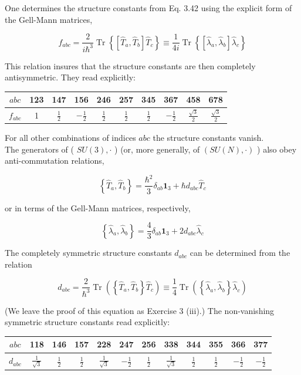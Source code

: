 \documentclass[10pt, letterpaper]{article}
\begin{document}
One determines the structure constants from Eq. 3.42 using the explicit form of the Gell-Mann matrices,

$$
f_{a b c}=\frac{2}{i \hbar^{3}} \operatorname{Tr}\left\{\left[\hat{T}_{a}, \hat{T}_{b}\right] \hat{T}_{c}\right\} \equiv \frac{1}{4 i} \operatorname{Tr}\left\{\left[\hat{\lambda}_{a}, \hat{\lambda}_{b}\right] \hat{\lambda}_{c}\right\}
$$

This relation insures that the structure constants are then completely antisymmetric. They read explicitly:

\begin{center}
\begin{tabular}{c||c|c|c|c|c|c|c|c|c}
$a b c$ & 123 & 147 & 156 & 246 & 257 & 345 & 367 & 458 & 678 \\
\hline
$f_{a b c}$ & 1 & $\frac{1}{2}$ & $-\frac{1}{2}$ & $\frac{1}{2}$ & $\frac{1}{2}$ & $\frac{1}{2}$ & $-\frac{1}{2}$ & $\frac{\sqrt{3}}{2}$ & $\frac{\sqrt{3}}{2}$ \\
\hline
\end{tabular}
\end{center}

For all other combinations of indices $a b c$ the structure constants vanish.\\
The generators of ( $S U(3), \cdot$ ) (or, more generally, of $(S U(N), \cdot)$ ) also obey anti-commutation relations,

$$
\left\{\hat{T}_{a}, \hat{T}_{b}\right\}=\frac{\hbar^{2}}{3} \delta_{a b} \mathbf{1}_{3}+\hbar d_{a b c} \hat{T}_{c}
$$

or in terms of the Gell-Mann matrices, respectively,

$$
\left\{\hat{\lambda}_{a}, \hat{\lambda}_{b}\right\}=\frac{4}{3} \delta_{a b} \mathbf{1}_{3}+2 d_{a b c} \hat{\lambda}_{c}
$$

The completely symmetric structure constants $d_{a b c}$ can be determined from the relation

$$
d_{a b c}=\frac{2}{\hbar^{3}} \operatorname{Tr}\left(\left\{\hat{T}_{a}, \hat{T}_{b}\right\} \hat{T}_{c}\right) \equiv \frac{1}{4} \operatorname{Tr}\left(\left\{\hat{\lambda}_{a}, \hat{\lambda}_{b}\right\} \hat{\lambda}_{c}\right)
$$

(We leave the proof of this equation as Exercise 3 (iii).) The non-vanishing symmetric structure constants read explicitly:

\begin{center}
\begin{tabular}{c||c|c|c|c|c|c|c|c|c|c|c}
$a b c$ & 118 & 146 & 157 & 228 & 247 & 256 & 338 & 344 & 355 & 366 & 377 \\
\hline
$d_{a b c}$ & $\frac{1}{\sqrt{3}}$ & $\frac{1}{2}$ & $\frac{1}{2}$ & $\frac{1}{\sqrt{3}}$ & $-\frac{1}{2}$ & $\frac{1}{2}$ & $\frac{1}{\sqrt{3}}$ & $\frac{1}{2}$ & $\frac{1}{2}$ & $-\frac{1}{2}$ & $-\frac{1}{2}$ \\
\hline
\end{tabular}
\end{center}
\end{document}
